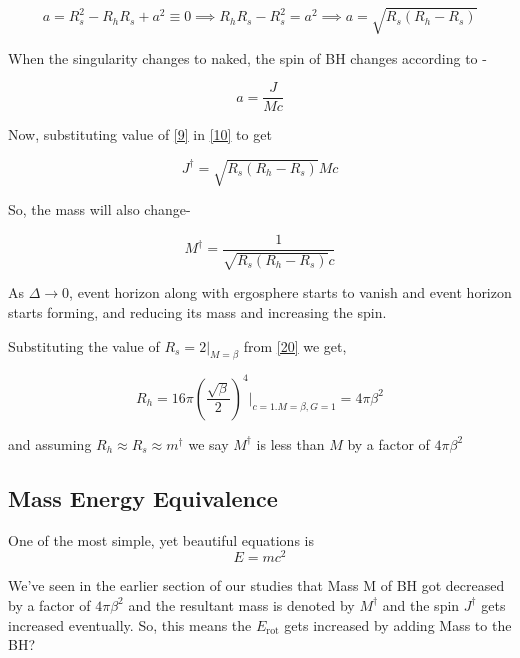 \documentclass{article}
\begin{document}
\begin{equation}
    a=R_s^2- R_hR_s+a^2\equiv0\implies R_hR_s-R_s^2 = a^2\implies a=\sqrt{R_s(R_h-R_s)}
    \label{9}
\end{equation}

When the singularity changes to naked, the spin of BH changes according to -

\begin{equation}
    a= \frac{J}{Mc}
    \label{10}
\end{equation}

Now, substituting value of  \eqref{9} in \eqref{10} to get

\begin{equation}
    J^\dagger= \sqrt{R_s(R_h-R_s)} Mc
    \label{11}
\end{equation}


So, the mass will also change- 

\begin{equation}
    M^\dagger=\frac{1}{\sqrt{R_s(R_h-R_s)} c}
    \label{12}
\end{equation}

As $\Delta\rightarrow
 0$, event horizon along with ergosphere starts to vanish and event horizon starts forming, and reducing its mass and increasing the spin.

Substituting the value of $R_s = 2\bigg|_{M=\beta}
$ from \eqref{20} we get,

\begin{equation}
    R_h= 16\pi \left(\frac{\sqrt{\beta}}{2}\right)^4
\bigg|_{c=1.M=\beta, G=1}=4\pi\beta^2
\label{13}
\end{equation}

and assuming $R_h\approx
R_s\approx
m^\dagger$ we say $M^\dagger$ is less than $M$ by a factor of $4\pi\beta^2$



\subsection{\Large Mass Energy Equivalence }

One of the most simple, yet beautiful equations is 
$$E=mc^2$$

We've seen in the earlier section of our studies that Mass M of BH got decreased by a factor of $4\pi\beta^2$ and the resultant mass is denoted by $M^\dagger$ and the spin $J^\dagger$  gets increased eventually. So, this means the $E_\text{rot}$ gets increased by adding Mass to the BH?
\end{document}
